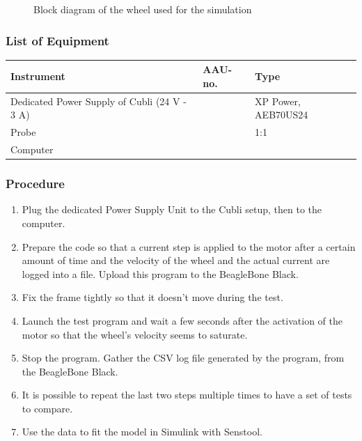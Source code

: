 \begin{figure}[H]
  
  \centering
  \caption{Block diagram of the wheel used for the simulation}
  \label{Parameters}
\end{figure}


\subsubsection{List of Equipment}
\begin{table}[H]
  \begin{tabular}{|l|l|p{4.3cm}|}
    \hline%
    \textbf{Instrument}                                   &  \textbf{AAU-no.} &  \textbf{Type}            \\
    \hline%
    Dedicated Power Supply of Cubli \small{(24 V - 3 A)}  &                   &  XP Power, AEB70US24      \\
    \hline%
    Probe                                                 &                   &  1:1                      \\
    \hline%
    Computer                                              &                   &                           \\
    \hline%
  \end{tabular}
\end{table}

\subsubsection{Procedure}
\begin{enumerate}
  \item Plug the dedicated Power Supply Unit to the Cubli setup, then to the computer.
  \item Prepare the code so that a current step is applied to the motor after a certain amount of time and the velocity of the wheel and the actual current are logged into a file. Upload this program to the BeagleBone Black.
  \item Fix the frame tightly so that it doesn't move during the test.
  \item Launch the test program and wait a few seconds after the activation of the motor so that the wheel's velocity seems to saturate.
  \item Stop the program. Gather the CSV log file generated by the program, from the BeagleBone Black.
  \item It is possible to repeat the last two steps multiple times to have a set of tests to compare.
  \item Use the data to fit the model in Simulink with Senstool.
\end{enumerate}